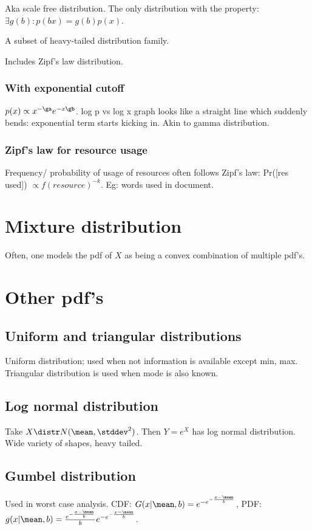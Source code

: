 \documentclass[oneside, article]{memoir}
\begin{document}
Aka scale free distribution. The only \why distribution with the property: $\exists g(b): p(bx) = g(b)p(x)$.

A subset of heavy-tailed distribution family.

Includes Zipf's law distribution.

\subsubsection{With exponential cutoff}
$p(x) \propto x^{-\ga}e^{-x\gb}$. log p vs log x graph looks like a straight line which suddenly bends: exponential term starts kicking in. Akin to gamma distribution.

\subsubsection{Zipf's law for resource usage}
Frequency/ probability of usage of resources often follows Zipf's law: Pr([res used]) $\propto f(resource)^{-k}$. Eg: words used in document.

\section{Mixture distribution}
Often, one models the pdf of $X$ as being a convex combination of multiple pdf's.

\section{Other pdf's}
\subsection{Uniform and triangular distributions}
Uniform distribution; used when not information is available except min, max. Triangular distribution is used when mode is also known.

\subsection{Log normal distribution}
Take $X \distr N(\mean, \stddev^{2})$. Then $Y = e^{X}$ has log normal distribution. Wide variety of shapes, heavy tailed.

\subsection{Gumbel distribution}
Used in worst case analysis. CDF: $G(x|\mean, b) = e^{-e^{-\frac{x - \mean}{b}}}$, PDF: $g(x|\mean, b) = \frac{e^{-\frac{x - \mean}{b}}}{b}e^{-e^{-\frac{x - \mean}{b}}}$.
\end{document}
